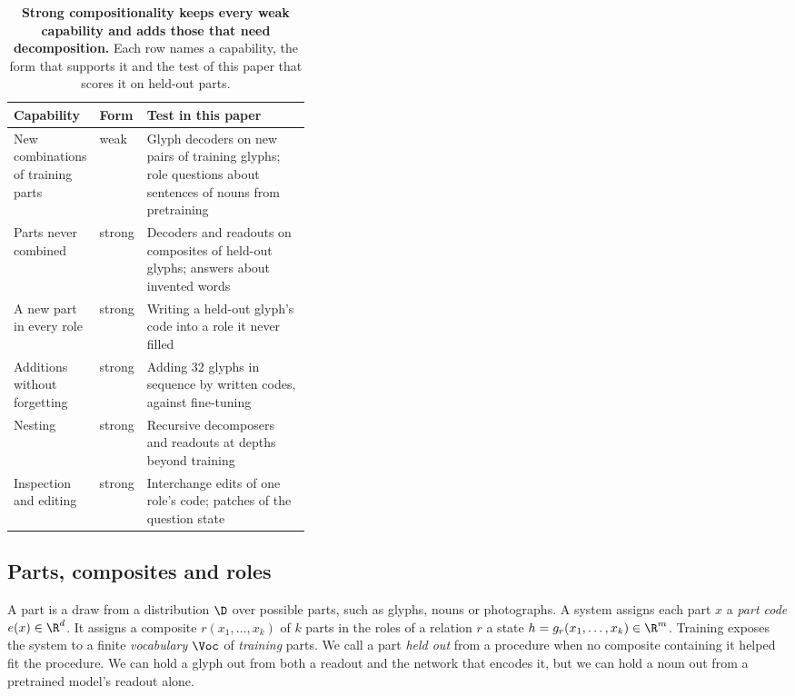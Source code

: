 \begin{table}[t]
  \caption{\textbf{Strong compositionality keeps every weak capability and adds those that need decomposition.} Each row names a capability, the form that supports it and the test of this paper that scores it on held-out parts.}
  \label{tab:capabilities}
  \centering\small
  \begin{tabularx}{\linewidth}{@{}P{0.27\linewidth}P{0.11\linewidth}Y@{}}
    \toprule
    Capability & Form & Test in this paper \\
    \midrule
    New combinations of training parts & weak & Glyph decoders on new pairs of training glyphs; role questions about sentences of nouns from pretraining \\
    Parts never combined & strong & Decoders and readouts on composites of held-out glyphs; answers about invented words \\
    A new part in every role & strong & Writing a held-out glyph's code into a role it never filled \\
    Additions without forgetting & strong & Adding 32 glyphs in sequence by written codes, against fine-tuning \\
    Nesting & strong & Recursive decomposers and readouts at depths beyond training \\
    Inspection and editing & strong & Interchange edits of one role's code; patches of the question state \\
    \bottomrule
  \end{tabularx}
\end{table}

\subsection{Parts, composites and roles}
\label{sec:intuition}

A part is a draw from a distribution $\D$ over possible parts, such as glyphs, nouns or photographs. A system assigns each part $x$ a \emph{part code} $e(x) \in \R^d$. It assigns a composite $r(x_1, \ldots, x_k)$ of $k$ parts in the roles of a relation $r$ a state $h = g_r(x_1, \ldots, x_k) \in \R^m$. Training exposes the system to a finite \emph{vocabulary} $\Voc$ of \emph{training} parts. We call a part \emph{held out} from a procedure when no composite containing it helped fit the procedure. We can hold a glyph out from both a readout and the network that encodes it, but we can hold a noun out from a pretrained model's readout alone.

